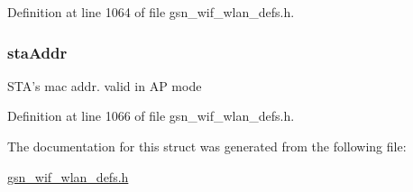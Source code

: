 Definition at line 1064 of file gsn\_\-wif\_\-wlan\_\-defs.h.

\hypertarget{a00380_a3ca54ba7eb6c301c5b6584284a9ccb8b}{
\subsubsection[{staAddr}]{ {\bf staAddr}}}
\label{a00380_a3ca54ba7eb6c301c5b6584284a9ccb8b}
STA's mac addr. valid in AP mode 

Definition at line 1066 of file gsn\_\-wif\_\-wlan\_\-defs.h.



The documentation for this struct was generated from the following file:\begin{DoxyCompactItemize}
\item 
\hyperlink{a00613}{gsn\_\-wif\_\-wlan\_\-defs.h}\end{DoxyCompactItemize}
